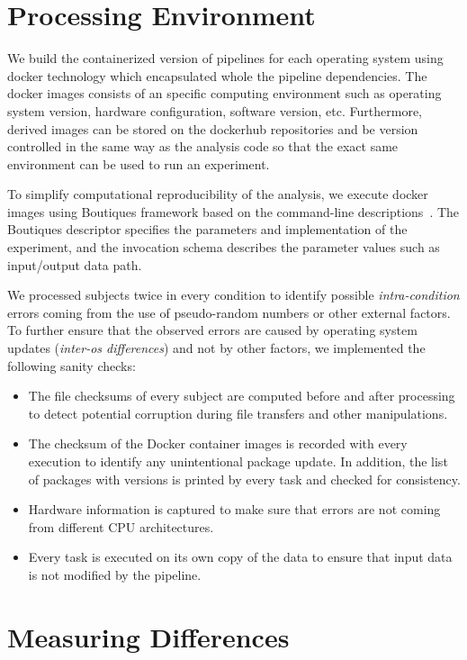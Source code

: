 \documentclass{article}
\begin{document}
{\section{Processing Environment}

We build the containerized version of pipelines for each operating 
system using docker technology which encapsulated whole the pipeline 
dependencies. The docker images consists of an specific computing 
environment such as operating system version, hardware configuration, 
software version, etc. Furthermore, derived images can be stored on 
the dockerhub repositories and be version controlled in the same way as 
the analysis code so that the exact same environment can be used to run 
an experiment.

To simplify computational reproducibility of the analysis, we execute 
docker images using Boutiques framework based on the command-line 
descriptions~\cite{glatard2017boutiques}. The Boutiques descriptor 
specifies the parameters and implementation of the experiment, and the 
invocation schema describes the parameter values such as input/output 
data path.

We processed subjects twice in every condition to identify possible 
\emph{intra-condition} errors coming from the use of pseudo-random 
numbers or other external factors. To further ensure that the observed 
errors are caused by operating system updates (\emph{inter-os 
differences}) and not by other factors, we implemented the following 
sanity checks:

\begin{itemize}

\item The file checksums of every subject are computed before and after 
processing to detect potential corruption during file transfers and 
other manipulations. 
\item The checksum of the Docker container images is recorded with
  every execution to identify any unintentional package update. In 
  addition, the list of packages with versions is printed by every task 
  and checked for consistency.
\item Hardware information is captured to make sure that errors are
  not coming from different CPU architectures.
\item Every task is executed on its own copy of the data to ensure
  that input data is not modified by the pipeline. 
\end{itemize}
	

\section{Measuring Differences}

}
\end{document}
